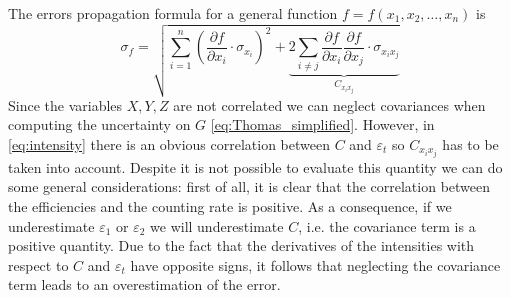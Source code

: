 The errors propagation formula for a general function $f = f\left( x_1, x_2, \dots, x_n\right)$ is
\begin{equation}\label{eq:error_propagation}
	\sigma_f = \sqrt{\sum_{i = 1}^{n}\left( \frac{\partial f}{\partial x_i}\cdot \sigma_{x_i}\right)^2 + \underbrace{2\sum_{i\ne j}\frac{\partial f}{\partial x_i}\frac{\partial f}{\partial x_j}\cdot \sigma_{x_i x_j}}_{C_{x_i x_j}}}
\end{equation}
Since the variables $X,Y,Z$ are not correlated we can neglect covariances when computing the uncertainty on $G$ \eqref{eq:Thomas_simplified}. However, in \eqref{eq:intensity} there is an obvious correlation between $C$ and $\varepsilon_t$ so $C_{x_i x_j}$ has to be taken into account. Despite it is not possible to evaluate this quantity we can do some general considerations: first of all, it is clear that the correlation between the efficiencies and the counting rate is positive. As a consequence, if we underestimate $\varepsilon_1$ or $\varepsilon_2$ we will underestimate $C$, i.e. the covariance term is a positive quantity. Due to the fact that the derivatives of the intensities with respect to $C$ and $\varepsilon_t$ have opposite signs, it follows that neglecting the covariance term leads to an overestimation of the error.

